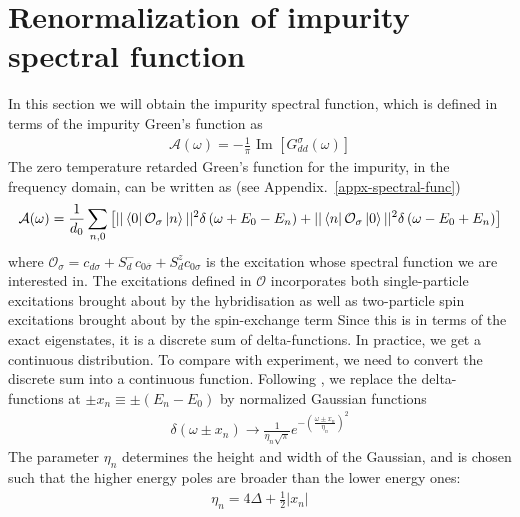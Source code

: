 \documentclass{report}
\numberwithin{equation}{section}
\begin{document}
\section{Renormalization of impurity spectral function}
In this section we will obtain the impurity spectral function, which is defined in terms of the impurity Green's function as
\begin{equation}\begin{aligned}
	\mathcal{A(\omega)} = -\frac{1}{\pi}\text{ Im }\left[G_{dd}^\sigma\left( \omega \right) \right] 
\end{aligned}\end{equation}
The zero temperature retarded Green's function for the impurity, in the frequency domain, can be written as (see Appendix.~\ref{appx-spectral-func})
\begin{equation}\begin{aligned}
	\mathcal{A(\omega)} = \frac{1}{d_0}\sum_{n,0}\left[||\bra{0}\mathcal{O}_{\sigma}\ket{n}||^2\delta\left(\omega + E_0 - E_n\right) + ||\bra{n}\mathcal{O}_{\sigma}\ket{0}||^2\delta\left(\omega - E_0 + E_n\right)\right]
\end{aligned}\end{equation}
where \(\mathcal{O}_\sigma = c_{d\sigma} + S_d^- c_{0\overline\sigma} + S_d^z c_{0\sigma}\) is the excitation whose spectral function we are interested in. The excitations defined in \(\mathcal{O}\) incorporates both single-particle excitations brought about by the hybridisation as well as two-particle spin excitations brought about by the spin-exchange term
Since this is in terms of the exact eigenstates, it is a discrete sum of delta-functions. In practice, we get a continuous distribution. To compare with experiment, we need to convert the discrete sum into a continuous function. Following \cite{bullaNRGreview}, we replace the delta-functions at \(\pm x_n \equiv \pm(E_n - E_0)\) by normalized Gaussian functions
\begin{equation}\begin{aligned}
	\delta(\omega \pm x_n) \to \frac{1}{\eta_n\sqrt \pi}e^{-\left(\frac{\omega \pm x_n}{\eta_n}\right)^2}
\end{aligned}\end{equation}
The parameter \(\eta_n\) determines the height and width of the Gaussian, and is chosen such that the higher energy poles are broader than the lower energy ones:
\begin{equation}\begin{aligned}
	\eta_n = 4\Delta + \frac{1}{2}|x_n| 
\end{aligned}\end{equation}
\end{document}
